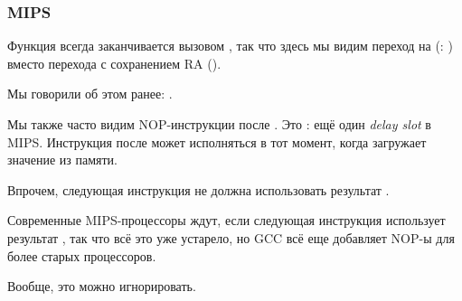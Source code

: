 \subsubsection{MIPS}




Функция всегда заканчивается вызовом \puts, так что здесь мы видим переход на \puts (: )
вместо перехода с сохранением \ac{RA} ().

Мы говорили об этом ранее: .

Мы также часто видим NOP-инструкции после .
Это : ещё один \emph{delay slot} в MIPS.
Инструкция после  может исполняться в тот момент, когда  загружает значение из памяти.

Впрочем, следующая инструкция не должна использовать результат .

Современные MIPS-процессоры ждут, если следующая инструкция использует результат , так что всё это уже
устарело, но GCC всё еще добавляет NOP-ы для более старых процессоров.

Вообще, это можно игнорировать.

